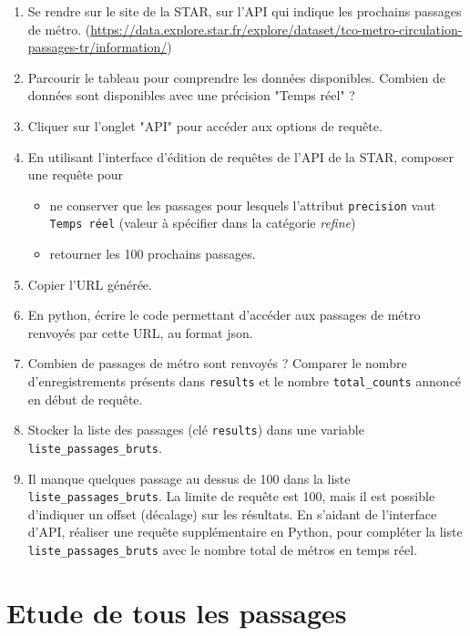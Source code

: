\documentclass[11pt,a4paper]{article}
\begin{document}
\begin{enumerate}
    \item Se rendre sur le site de la STAR, sur l'API qui indique les prochains passages de métro. (\url{https://data.explore.star.fr/explore/dataset/tco-metro-circulation-passages-tr/information/})
    \item Parcourir le tableau pour comprendre les données disponibles. Combien de données sont disponibles avec une précision "Temps réel" ? 
    \item Cliquer sur l'onglet "API" pour accéder aux options de requête.
    \item En utilisant l'interface d'édition de requêtes de l'API de la STAR, composer une requête pour 
    \begin{itemize}
        \item ne conserver que les passages pour lesquels l'attribut \verb+precision+ vaut \verb+Temps réel+ (valeur à spécifier dans la catégorie \emph{refine})
        \item retourner les 100 prochains passages.
    \end{itemize}
    \item Copier l'URL générée.
    \item En python, écrire le code permettant d'accéder aux passages de métro renvoyés par cette URL, au format json. 
    \item Combien de passages de métro sont renvoyés ? Comparer le nombre d'enregistrements présents dans \verb+results+ et le nombre \verb+total_counts+ annoncé en début de requête.
    \item Stocker la liste des passages (clé \verb+results+) dans une variable \verb+liste_passages_bruts+.
    \item Il manque quelques passage au dessus de 100 dans la liste \verb+liste_passages_bruts+. La limite de requête est 100, mais il est possible d'indiquer un offset (décalage) sur les résultats. En s'aidant de l'interface d'API, réaliser une requête supplémentaire en Python, pour compléter la liste \verb+liste_passages_bruts+ avec le nombre total de métros en temps réel.
\end{enumerate}

\section{Etude de tous les passages}
\end{document}
